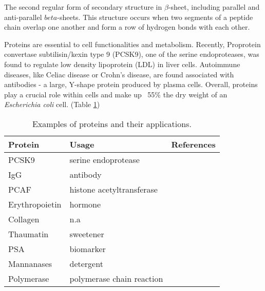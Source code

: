 \begin{refsection}
\begin{figure}[h!]
    \label{fig:alpha-helix-stabilization}
\end{figure}

The second regular form of secondary structure in $\beta$-sheet, including
parallel and anti-parallel $beta$-sheets\cite{Astbury1932}. This structure
occurs when two segments of a peptide chain overlap one another and form a row
of hydrogen bonds with each other. 

Proteins are essential to cell functionalities and metabolism. Recently,
Proprotein convertase subtilisin/kexin type 9 (PCSK9), one of the serine
endoproteases, was found to regulate low density lipoprotein (LDL) in liver
cells\cite{Lambert2012,Horton2007}. Autoimmune diseases, like Celiac
disease\cite{Dessein2008} or Crohn's disease\cite{Sollid2005,
Meize-Grochowski}, are found associated with antibodies - a large, Y-shape
protein produced by plasma cells. Overall, proteins play a crucial role within
cells and make up ~55\% the dry weight of an \emph{Escherichia coli}
cell\cite{Neidhardt1990}. (Table \ref{tab:protein-app})
\begin{table}[h!]
    \centering
    \begin{tabular}{ lll }
        \hline
        Protein & Usage & References \\
        \hline
        
        PCSK9 & serine endoprotease & \cite{Lambert2012,Horton2007} \\
        IgG & antibody & \cite{Sollid2005, Meize-Grochowski} \\
        PCAF & histone acetyltransferase & \cite{Mehta2011b} \\
        Erythropoietin & hormone & \cite{Haroon2003,Siren2001} \\
        Collagen & n.a & \cite{Bella1995} \\
        Thaumatin & sweetener & \cite{Green1999} \\
        PSA & biomarker & \cite{Crawford2014} \\
        Mannanases & detergent & \cite{Kirk2002} \\
        Polymerase & polymerase chain reaction & \cite{Berg2002} \\ 
        
        \hline
    \end{tabular}
    \caption[Examples of proteins and their applications.]{Examples of proteins
    and their applications.} \label{tab:protein-app}
\end{table}
 

\end{refsection}
